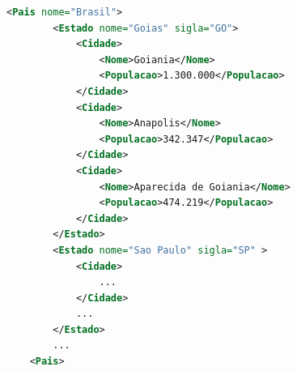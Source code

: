 \begin{lstlisting}[language=xml,label=code:exemplo-xml,caption=Exemplo de código XML representando uma ontologia simples de cidades.]
	<Pais nome="Brasil">
		<Estado nome="Goias" sigla="GO">
			<Cidade>
				<Nome>Goiania</Nome>
				<Populacao>1.300.000</Populacao>
			</Cidade>
			<Cidade>
				<Nome>Anapolis</Nome>
				<Populacao>342.347</Populacao>
			</Cidade>
			<Cidade>
				<Nome>Aparecida de Goiania</Nome>
				<Populacao>474.219</Populacao>
			</Cidade>
		</Estado>
		<Estado nome="Sao Paulo" sigla="SP" >
			<Cidade>
				...
			</Cidade>
			...
		</Estado>
		...
	<Pais>
\end{lstlisting}

















